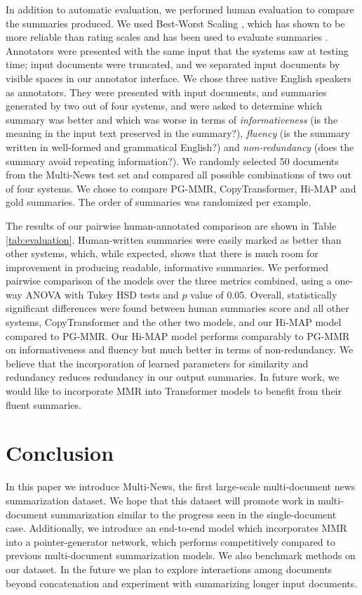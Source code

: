 \documentclass[11pt,a4paper]{article}
\begin{document}
In addition to automatic evaluation, we performed human evaluation to compare the summaries produced. We used Best-Worst Scaling \cite{louvrier1991, louvrier2015}, which has shown to be more reliable than rating scales \cite{kiritchenko17} and has been used to evaluate  summaries \cite{narayan18xsum, angelidis18opinions}. Annotators were presented with the same input that the systems saw at testing time; input documents were truncated, and we separated input documents by visible spaces in our annotator interface. We chose three native English speakers as annotators. They were presented with input documents, and summaries generated by two out of four systems, and were asked to determine which summary was better and which was worse in terms of \textit{informativeness} (is the meaning in the input text preserved in the summary?), \textit{fluency} (is the summary written in well-formed and grammatical English?) and 
\textit{non-redundancy} (does the summary avoid repeating information?). We randomly selected 50 documents from the Multi-News test set and compared all possible combinations of two out of four systems. We chose to compare PG-MMR, CopyTransformer, Hi-MAP and gold summaries. The order of summaries was randomized per example.


The results of our pairwise human-annotated comparison are shown in Table \ref{tab:evaluation}. Human-written summaries were easily marked as better than other systems, which, while expected, shows that there is much room for improvement in producing readable, informative summaries. We performed pairwise comparison of the models over the three metrics combined, using a one-way ANOVA with Tukey HSD tests and $p$ value of 0.05. Overall, statistically significant differences were found between human summaries score and all other systems, CopyTransformer and the other two models, and our Hi-MAP model compared to PG-MMR. Our Hi-MAP model performs comparably to PG-MMR on informativeness and fluency but much better in terms of non-redundancy. We believe that the incorporation of learned parameters for similarity and redundancy reduces redundancy in our output summaries. In future work, we would like to incorporate MMR into Transformer models to benefit from their fluent summaries. 
\section{Conclusion}
\vspace{-2mm}
In this paper we introduce Multi-News, the first large-scale multi-document news summarization dataset. We hope that this dataset will promote work in multi-document summarization similar to the progress seen in the single-document case. Additionally, we introduce an end-to-end model which incorporates MMR into a pointer-generator network, which performs competitively compared to previous multi-document summarization models. We also benchmark methods on our dataset. In the future we plan to explore interactions among documents beyond concatenation and experiment with summarizing longer input documents. 








\end{document}
